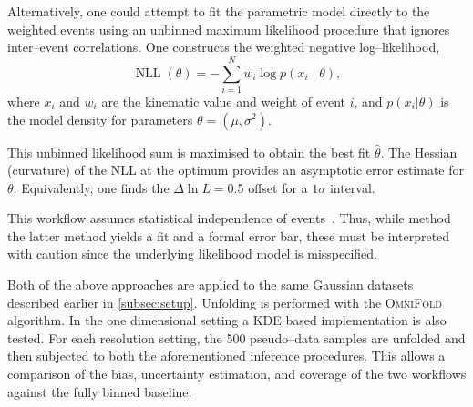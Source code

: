         Alternatively, one could attempt to fit the parametric model directly to the weighted events using an unbinned maximum likelihood procedure that ignores inter--event correlations.
        One constructs the weighted negative log--likelihood,
        \[
            \operatorname{NLL}(\theta) = -\sum_{i=1}^N w_i \log p(x_i \mid \theta),
        \]
        where $x_i$ and $w_i$ are the kinematic value and weight of event $i$, and $p(x_i|\theta)$ is the model density for parameters $\theta=(\mu,\sigma^2)$.
        
        This unbinned likelihood sum is maximised to obtain the best fit $\hat\theta$.
        The Hessian (curvature) of the NLL at the optimum provides an asymptotic error estimate for $\theta$.
        Equivalently, one finds the $\Delta\ln L=0.5$ offset for a $1\sigma$ interval.
        
        This workflow assumes statistical independence of events~\cite{cowan_survey_2002, blobel, Blobel:2011fih, Blobel2013Unfolding}.
        Thus, while method the latter method yields a fit and a formal error bar, these must be interpreted with caution since the underlying likelihood model is misspecified.
    
        Both of the above approaches are applied to the same Gaussian datasets described earlier in \cref{subsec:setup}.
        Unfolding is performed with the \textsc{OmniFold} algorithm.
        In the one dimensional setting a KDE based implementation is also tested.
        For each resolution setting, the 500 pseudo--data samples are unfolded and then subjected to both the aforementioned inference procedures.
        This allows a comparison of the bias, uncertainty estimation, and coverage of the two workflows against the fully binned baseline.
